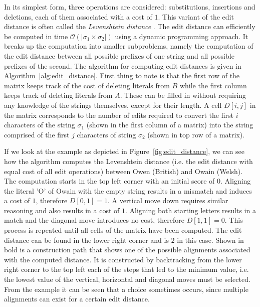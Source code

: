 \documentclass[paper=a4, fontsize=11pt]{scrartcl}
\begin{document}
In its simplest form, three operations are considered: substitutions, insertions and deletions, each of them associated with a cost of $1$.
This variant of the edit distance is often called the \emph{Levenshtein distance} .
The edit distance can efficiently be computed in time $\mathcal{O}(\vert \sigma_1 \times \sigma_2 \vert)$ using a dynamic programming approach.
It breaks up the computation into smaller subproblems, namely the computation of the edit distance between all possible prefixes of one string and all possible prefixes of the second.
The algorithm for computing edit distances is given in Algorithm~\ref{alg:edit_distance}.
First thing to note is that the first row of the matrix keeps track of the cost of deleting literals from $B$ while the first column keeps track of deleting literals from $A$.
These can be filled in without requiring any knowledge of the strings themselves, except for their length.
A cell $D[i,j]$ in the matrix corresponds to the number of edits required to convert the first $i$ characters of the string $\sigma_1$ (shown in the first column of a matrix) into the string comprised of the first $j$ characters of string $\sigma_2$ (shown in top row of a matrix).\cite{christen12}

If we look at the example as depicted in Figure~\ref{fig:edit_distance}, we can see how the algorithm computes the Levenshtein distance (i.e. the edit distance with equal cost of all edit operations) between Owen (British) and Owain (Welsh).
The computation starts in the top left corner with an initial score of $0$.
Aligning the literal 'O' of Owain with the empty string results in a mismatch and induces a cost of $1$, therefore $D[0, 1]=1$.
A vertical move down requires similar reasoning and also results in a cost of $1$.
Aligning both starting letters results in a match and the diagonal move introduces no cost, therefore $D[1, 1]=0$.
This process is repeated until all cells of the matrix have been computed.
The edit distance can be found in the lower right corner and is $2$ in this case.
Shown in bold is a construction path that shows one of the possible alignments associated with the computed distance.
It is constructed by backtracking from the lower right corner to the top left each of the steps that led to the minimum value, i.e. the lowest value of the vertical, horizontal and diagonal moves must be selected.
From the example it can be seen that a choice sometimes occurs, since multiple alignments can exist for a certain edit distance.
\end{document}
